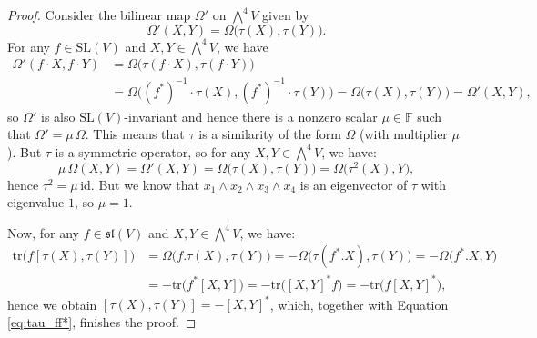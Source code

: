 \documentclass[a4paper,reqno]{amsart}
\theoremstyle{definition}
\numberwithin{theorem}{section}
\numberwithin{equation}{section}
\begin{document}
\begin{proof}
Consider the bilinear map $\Omega'$ on $\bigwedge^4V$ given by 
\[
\Omega'(X,Y)=\Omega\bigl(\tau(X),\tau(Y)\bigr).
\] 
For any $f\in{\mathrm{SL}}(V)$ and $X,Y\in\bigwedge^4V$, we have
\[
\begin{split}
\Omega'(f\cdot X,f\cdot Y)&=\Omega\bigl(\tau(f\cdot X),\tau(f\cdot Y)\bigr)\\
&=\Omega\bigl((f^*)^{-1}\cdot \tau(X),(f^*)^{-1}\cdot \tau(Y)\bigr)=\Omega\bigl(\tau(X),\tau(Y)\bigr)=\Omega'(X,Y),
\end{split}
\]
so $\Omega'$ is also ${\mathrm{SL}}(V)$-invariant and hence there is a nonzero scalar $\mu\in{\mathbb{F}}$ such that $\Omega'=\mu\,\Omega$. This means that $\tau$ is a similarity of the form $\Omega$ (with multiplier $\mu$). But $\tau$ is a symmetric operator, so for any $X,Y\in\bigwedge^4V$, we have:
\[
\mu\,\Omega(X,Y)=\Omega'(X,Y)=\Omega\bigl(\tau(X),\tau(Y)\bigr)=\Omega\bigl(\tau^2(X),Y\bigr),
\]
hence $\tau^2=\mu\,{\mathrm{id}}$. But we know that $x_1\wedge x_2\wedge x_3\wedge x_4$ is an eigenvector of $\tau$ with eigenvalue $1$, so $\mu=1$.

Now, for any $f\in {{\mathfrak{sl}}}(V)$ and $X,Y\in\bigwedge^4V$, we have:
\[
\begin{split}
{\mathrm{tr}}\bigl(f[\tau(X),\tau(Y)]\bigr)&=\Omega\bigl(f.\tau(X),\tau(Y)\bigr)=-\Omega\bigl(\tau(f^*.X),\tau(Y)\bigr)=-\Omega\bigl(f^*.X,Y\bigr)\\
& = -{\mathrm{tr}}\bigl(f^*[X,Y]\bigr)=-{\mathrm{tr}}\bigl([X,Y]^*f\bigr)=-{\mathrm{tr}}\bigl(f[X,Y]^*\bigr),
\end{split}
\]
hence we obtain $[\tau(X),\tau(Y)]=-[X,Y]^*$, which, together with Equation \eqref{eq:tau_ff*}, finishes the proof.
\end{proof}
\end{document}
